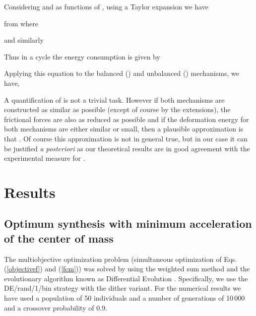 \documentclass[11pt]{article}
\begin{document}
Considering  and  as functions of , using a Taylor 
expansion we have

 from where 
 
and similarly 



Thus in a cycle the energy consumption is given by


Applying this equation to  the balanced () and unbalanced () 
mechanisms, we have,
 

A quantification of  is not a trivial task. However
if both mechanisms are constructed as similar as possible (except of 
course by the extensions), the frictional forces are also as reduced as 
possible and if  the deformation energy for both mechanisms are either 
similar or small, then a plausible approximation is that 
. Of course this 
approximation is not in general true, but in our case it can be 
justified\emph{ a posteriori} as our theoretical results are in good 
agreement  with the experimental measure for . 


\section{Results}\label{Results}


\subsection{Optimum synthesis with minimum acceleration of the center of 
mass}
The multiobjective optimization problem (simultaneous optimization of 
Eqs. (\ref{objectivef}) and (\ref{fcm})) was solved by using the 
weighted sum method and the evolutionary algorithm known as Differential 
Evolution \cite{Price_Storn2005}. Specifically, we use the DE/rand/1/bin 
strategy with the dither variant. For the numerical results we have used 
a population of 50 individuals and a number of generations of 10\,000 and 
a crossover probability of 0.9.
  
\end{document}
